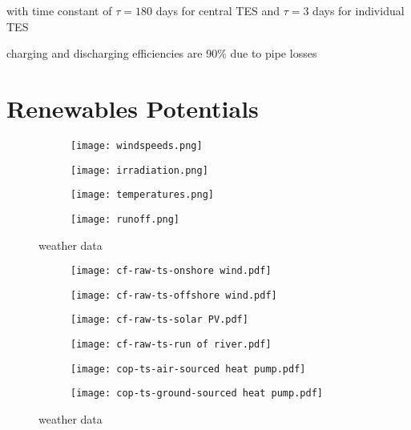 with time constant of $\tau=180$ days for central TES and $\tau=3$ days for individual TES

charging and discharging efficiencies are 90\% due to pipe losses

\section{Renewables Potentials}

\begin{figure}
    \centering
        \begin{subfigure}[t]{0.49\textwidth}
            \centering
        \texttt{[image: windspeeds.png]}
    \end{subfigure}
    \begin{subfigure}[t]{0.49\textwidth}
        \centering
        \texttt{[image: irradiation.png]}
    \end{subfigure}
    \begin{subfigure}[t]{0.49\textwidth}
        \centering
        \texttt{[image: temperatures.png]}
    \end{subfigure}
    \begin{subfigure}[t]{0.49\textwidth}
        \centering
        \texttt{[image: runoff.png]}
    \end{subfigure}
    \caption{weather data}
    \label{fig:weather-data}
\end{figure}

\begin{figure}
    \centering
        \begin{subfigure}[t]{0.49\textwidth}
            \centering
        \texttt{[image: cf-raw-ts-onshore wind.pdf]}
    \end{subfigure}
    \begin{subfigure}[t]{0.49\textwidth}
        \centering
        \texttt{[image: cf-raw-ts-offshore wind.pdf]}
    \end{subfigure}
    \begin{subfigure}[t]{0.49\textwidth}
        \centering
        \texttt{[image: cf-raw-ts-solar PV.pdf]}
    \end{subfigure}
    \begin{subfigure}[t]{0.49\textwidth}
        \centering
        \texttt{[image: cf-raw-ts-run of river.pdf]}
    \end{subfigure}
    \begin{subfigure}[t]{0.49\textwidth}
        \centering
        \texttt{[image: cop-ts-air-sourced heat pump.pdf]}
    \end{subfigure}
    \begin{subfigure}[t]{0.49\textwidth}
        \centering
        \texttt{[image: cop-ts-ground-sourced heat pump.pdf]}
    \end{subfigure}
    \caption{weather data}
    \label{fig:weather-data}
\end{figure}


